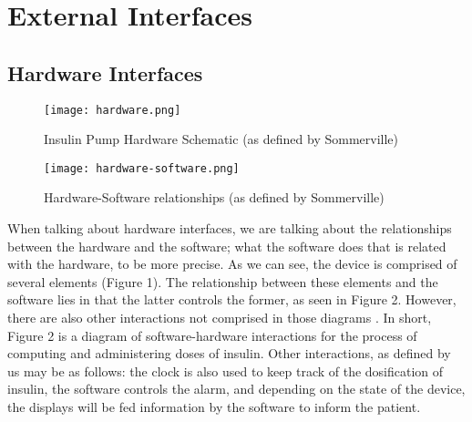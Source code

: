 \documentclass{scrreprt}
\begin{document}
\chapter{External Interfaces}

%

\section{Hardware Interfaces}

\begin{figure}[H]
  \centering
  \texttt{[image: hardware.png]}
  \caption{Insulin Pump Hardware Schematic (as defined by Sommerville)}
  \label{fig:hardwareint}

  \vspace{0.5cm}

  \texttt{[image: hardware-software.png]}
  \caption{Hardware-Software relationships (as defined by Sommerville)}
  \label{fig:hardware-software}
\end{figure}

When talking about hardware interfaces, we are talking about the relationships between the hardware and the software; what the software does that is related with the hardware, to be more precise.
As we can see, the device is comprised of several elements (Figure 1). The relationship between these elements and the software lies in that the latter controls the former, as seen in Figure 2. However, there are also
other interactions not comprised in those diagrams \cite{sommerville}. In short, Figure 2 is a diagram of software-hardware interactions for the process of computing and administering doses of \gls{insulin}. Other interactions,
as defined by us may be as follows: the clock is also used to keep track of the dosification of \gls{insulin}, the software controls the alarm, and depending on the state of the device, the displays will be fed information by 
the software to inform the \gls{patient}.
\end{document}
